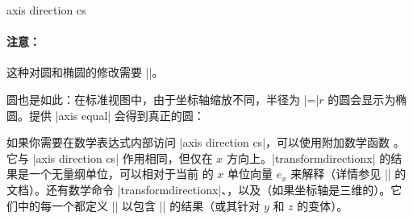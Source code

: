 \begin{coordinatesystem}{axis direction cs}
    \paragraph{注意：}

    这种对圆和椭圆的修改需要 |\pgfplotsset{compat=1.5.1}|。

    圆也是如此：在标准视图中，由于坐标轴缩放不同，半径为 |=|$r$ 的圆会显示为椭圆。提供 |axis equal| 会得到真正的圆：
\begin{codeexample}[]
\end{codeexample}
\begin{codeexample}[]
\end{codeexample}

    如果你需要在数学表达式内部访问 |axis direction cs|，可以使用附加数学函数 。它与 |axis direction cs| 作用相同，但仅在 $x$ 方向上。|transformdirectionx| 的结果是一个无量纲单位，可以相对于当前 \pgfname{} 的 $x$ 单位向量 $e_x$ 来解释（详情参见 |\pgfplotstransformdirectionx| 的文档）。还有数学命令 |transformdirectionx|、，以及（如果坐标轴是三维的）。它们中的每一个都定义 |\pgfmathresult| 以包含 |\pgfplotstransformdirectionx| 的结果（或其针对 $y$ 和 $z$ 的变体）。
\end{coordinatesystem}

